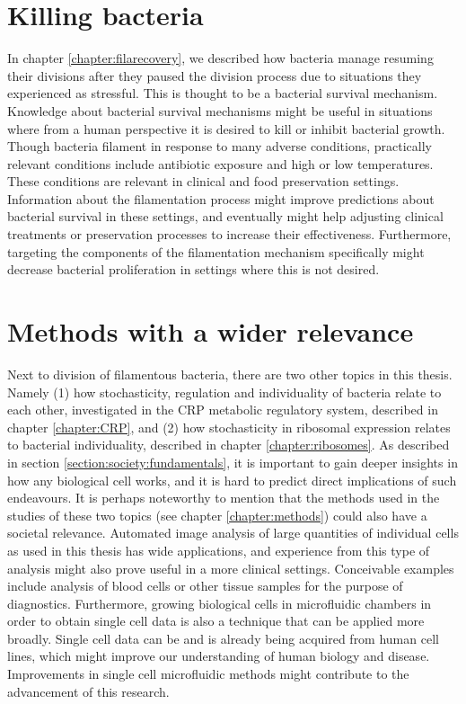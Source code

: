 \section{Killing bacteria}

In chapter \ref{chapter:filarecovery}, we described how bacteria manage resuming their divisions after they 
paused the division process due to situations they experienced as stressful.
%
This is thought to be a bacterial survival mechanism.
%
Knowledge about bacterial survival mechanisms might be useful in situations 
where from a human perspective it is desired to kill or inhibit bacterial growth.
%
Though bacteria filament in response to many adverse conditions, 
practically relevant conditions include antibiotic exposure and high or low temperatures.
%
These conditions are relevant in clinical and food preservation settings.
%
Information about the filamentation process might improve predictions about bacterial survival in these settings,
and eventually might help adjusting clinical treatments or preservation processes to increase their effectiveness.
%
Furthermore, targeting the components of the filamentation mechanism specifically might 
decrease bacterial proliferation in settings where this is not desired.

\section{Methods with a wider relevance}

Next to division of filamentous bacteria, there are two other topics in this thesis.
Namely 
(1) how stochasticity, regulation and individuality of bacteria relate to each other, investigated in the CRP metabolic regulatory system, described in chapter \ref{chapter:CRP},
and (2) how stochasticity in ribosomal expression relates to bacterial individuality, described in chapter \ref{chapter:ribosomes}.
%
As described in section \ref{section:society:fundamentals}, it is important to gain deeper insights in how any biological cell works,
and it is hard to predict direct implications of such endeavours.
%
It is perhaps noteworthy to mention that the methods used in the studies of these two topics (see chapter \ref{chapter:methods})
could also have a societal relevance. 
%
Automated image analysis of large quantities of individual cells as used in this thesis has wide applications, %
and experience from this type of analysis might also prove useful in a more clinical settings.
%
Conceivable examples include analysis of blood cells or other tissue samples for the purpose of diagnostics.
%
Furthermore, growing biological cells in microfluidic chambers in order to obtain single cell data is also a technique that can be applied more broadly.
%
Single cell data can be and is already being acquired from human cell lines, 
which might improve our understanding of human biology and disease.
%
Improvements in single cell microfluidic methods might contribute to the advancement of this research.

